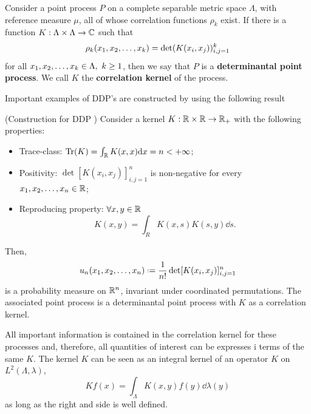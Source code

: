 \begin{definition}
	Consider a point process $P$ on a complete separable metric space $\Lambda$, with reference measure $\mu$, all of whose correlation functions $\rho_k$ exist. If there is a function $K: \Lambda \times \Lambda \rightarrow \mathbb{C}$ such that 
	\begin{equation}
		\rho_k(x_1, x_2, \dots, x_k) = \det(K(x_i, x_j))_{i,j = 1}^{k}
	\end{equation}
	for all $x_1, x_2, \dots, x_k \in \Lambda, \ k \geq 1$, then we say that $P$ is a \textbf{determinantal point process}. We call $K$ the \textbf{correlation kernel} of the process. 
\end{definition}

Important examples of DDP's are constructed by using the following result

\begin{thm} (Construction for DDP \cite{ManuelaGirottiPhD})
	Consider a kernel $K: \mathbb{R} \times \mathbb{R} \rightarrow \mathbb{R}_+$ with the following properties:
	\begin{itemize}
		\item Trace-class: $\operatorname{Tr}(K) = \int_{\mathbb{R}} K(x,x) \mathrm{d} x = n < + \infty$;
		\item Positivity: $\det[K(x_i, x_j)]_{i,j=1}^n$ is non-negative for every $x_1, x_2, \dots, x_n \in \mathbb{R}$;
		\item Reproducing property: $\forall x, y \in \mathbb{R}$
		\begin{equation}
			K(x,y) = \int_{R} K(x, s) K(s, y) \dd s.
		\end{equation}
	\end{itemize}
	Then, 
	\begin{equation}
		u_n(\mmany{x}{n}) \deff \frac{1}{n!} \det[K(x_i, x_j)]_{i,j = 1}^n
	\end{equation}
	is a probability measure on $\mathbb{R}^n$, invariant under coordinated permutations. The associated point process is a determinantal point process with $K$ as a correlation kernel.
\end{thm}

All important information is contained in the correlation kernel for these processes and, therefore, all quantities of interest can be expresses i terms of the same $K$. The kernel $K$ can be seen as an integral kernel of an operator $K$ on $L^2(\Lambda, \lambda)$,
\begin{equation}
	Kf(x) = \int_\Lambda K(x, y) f(y) \dd \lambda(y)
	\label{Equation: integral operator K}
\end{equation}
as long as the right and side is well defined.

